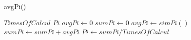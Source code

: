\documentclass[11pt]{ctexart}
\begin{document}
\renewcommand{\thealgorithm}{2} %
    \begin{algorithm}
        \caption{avgPi()} %
        \begin{algorithmic}[1] %
            \Require $TimesOfCalcul$
            \Ensure $Pi$
            \State $avgPi \leftarrow 0$
            \State $sumPi \leftarrow 0$
                \State $avgPi \leftarrow simPi()$
                \State $sumPi \leftarrow sumPi + avgPi$
            \EndFor
            \State $Pi \leftarrow sumPi/TimesOfCalcul $
        \end{algorithmic}
    \end{algorithm}
\end{document}
